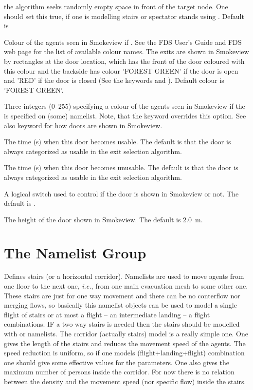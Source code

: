 \documentclass[12pt,a4paper,final,twoside]{stylevk}
\begin{document}
\begin{description}
  the algorithm seeks randomly empty space in front of the target
  node.  One should set this true, if one is modelling stairs or
  spectator stands using .  Default is 
%
\item[\Timts{COLOR}] Colour of the agents seen in Smokeview if
  .  See the FDS User's Guide and FDS web page
  for the list of available colour names.  The exits are shown in
  Smokeview by rectangles at the door location, which has the front of
  the door coloured with this colour and the backside has colour
  'FOREST GREEN' if the door is open and 'RED' if the door is closed
  (See the keywords  and ).
  Default colour is 'FOREST GREEN'.
%
\item[\Timts{RGB}] Three integers (0--255) specifying a colour of the
  agents seen in Smokeview if the  is specified
  on (some)  namelist.  Note, that the 
  keyword overrides this option.  See also  keyword for
  how doors are shown in Smokeview.
%
\item[\Timts{TIME\_OPEN}] The time (s) when this door becomes usable.
  The default is that the door is always categorized as usable in the
  exit selection algorithm.
%
\item[\Timts{TIME\_CLOSE}] The time (s) when this door becomes
  unusable.  The default is that the door is always categorized as
  usable in the exit selection algorithm.
%
\item[\Timts{SHOW}] A logical switch used to control if the door is
  shown in Smokeview or not.  The default is .
%
\item[\Timts{HEIGHT}] The height of the door shown in Smokeview.  The
  default is 2.0~m.
%
\end{description}


\section{The  Namelist Group}\label{Sec_CorrNML}

\noindent Defines stairs (or a horizontal corridor).  Namelists
 are used to move agents from one floor to the next one,
\emph{i.e.}, from one main evacuation mesh to some other one.  These
stairs are just for one way movement and there can be no conterflow
nor merging flows, so basically this namelist objects can be used to
model a single flight of stairs or at most a flight -- an intermediate
landing -- a flight combinations.  IF a two way stairs is needed then
the stairs should be modelled with  or 
namelists.  The corridor (actually stairs) model is a really simple
one.  One gives the length of the stairs and reduces the movement
speed of the agents.  The speed reduction is uniform, so if one models
(flight+landing+flight) combination one should give some effective
values for the parameters.  One also gives the maximum number of
persons inside the corridor.  For now there is no relation between the
density and the movement speed (nor specific flow) inside the stairs.
\end{document}
